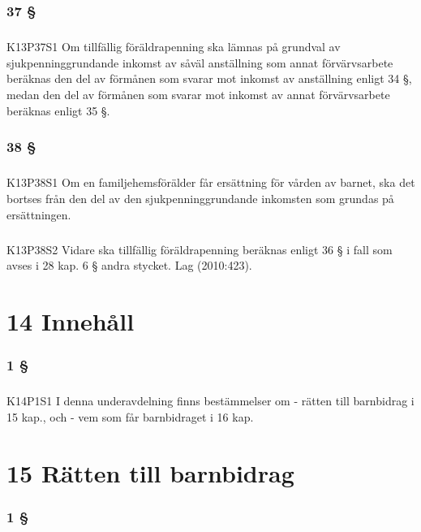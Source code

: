 \documentclass[a4paper,notitlepage,openany,10pt]{book}
\begin{document}
\subsection*{37 §}
\paragraph*{}
{\tiny K13P37S1}
Om tillfällig föräldrapenning ska lämnas på grundval av sjukpenninggrundande inkomst av såväl anställning som annat förvärvsarbete beräknas den del av förmånen som svarar mot inkomst av anställning enligt 34 §, medan den del av förmånen som svarar mot inkomst av annat förvärvsarbete beräknas enligt 35 §.
\subsection*{38 §}
\paragraph*{}
{\tiny K13P38S1}
Om en familjehemsförälder får ersättning för vården av barnet, ska det bortses från den del av den sjukpenninggrundande inkomsten som grundas på ersättningen.
\paragraph*{}
{\tiny K13P38S2}
Vidare ska tillfällig föräldrapenning beräknas enligt 36 § i fall som avses i 28 kap. 6 § andra stycket.
Lag (2010:423).
\chapter*{14 Innehåll}
\subsection*{1 §}
\paragraph*{}
{\tiny K14P1S1}
I denna underavdelning finns bestämmelser om
\newline - rätten till barnbidrag i 15 kap., och
\newline - vem som får barnbidraget i 16 kap.
\chapter*{15 Rätten till barnbidrag}
\subsection*{1 §}
\end{document}
